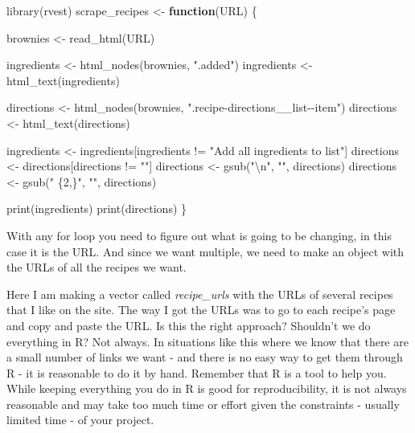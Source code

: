 \documentclass[
]{krantz}
\makeatletter
\newenvironment{Shaded}{\begin{snugshade}}{\end{snugshade}}
\newcommand{\ControlFlowTok}[1]{\textcolor[rgb]{0.27,0.27,0.27}{\textbf{#1}}}
\newcommand{\FunctionTok}[1]{\textcolor[rgb]{0,0,0}{#1}}
\newcommand{\NormalTok}[1]{#1}
\newcommand{\OtherTok}[1]{\textcolor[rgb]{0.37,0.37,0.37}{#1}}
\newcommand{\SpecialCharTok}[1]{\textcolor[rgb]{0,0,0}{#1}}
\newcommand{\StringTok}[1]{\textcolor[rgb]{0.5,0.5,0.5}{#1}}
\newenvironment{kframe}{%
\medskip{}
\setlength{\fboxsep}{.8em}
 \def\at@end@of@kframe{}%
 \ifinner\ifhmode%
  \def\at@end@of@kframe{\end{minipage}}%
  \begin{minipage}{\columnwidth}%
 \fi\fi%
 \def\FrameCommand##1{\hskip\@totalleftmargin \hskip-\fboxsep
 \colorbox{shadecolor}{##1}\hskip-\fboxsep
     \hskip-\linewidth \hskip-\@totalleftmargin \hskip\columnwidth}%
 \MakeFramed {\advance\hsize-\width
   \@totalleftmargin\z@ \linewidth\hsize
   \@setminipage}}%
 {\par\unskip\endMakeFramed%
 \at@end@of@kframe}
\renewenvironment{Shaded}{\begin{kframe}}{\end{kframe}}
\makeatother
\begin{document}
\begin{Shaded}
\begin{Highlighting}[]
\FunctionTok{library}\NormalTok{(rvest)}
\NormalTok{scrape\_recipes }\OtherTok{\textless{}{-}} \ControlFlowTok{function}\NormalTok{(URL) \{}

\NormalTok{  brownies }\OtherTok{\textless{}{-}} \FunctionTok{read\_html}\NormalTok{(URL)}

\NormalTok{  ingredients }\OtherTok{\textless{}{-}} \FunctionTok{html\_nodes}\NormalTok{(brownies, }\StringTok{".added"}\NormalTok{)}
\NormalTok{  ingredients }\OtherTok{\textless{}{-}} \FunctionTok{html\_text}\NormalTok{(ingredients)}

\NormalTok{  directions }\OtherTok{\textless{}{-}} \FunctionTok{html\_nodes}\NormalTok{(brownies, }\StringTok{".recipe{-}directions\_\_list{-}{-}item"}\NormalTok{)}
\NormalTok{  directions }\OtherTok{\textless{}{-}} \FunctionTok{html\_text}\NormalTok{(directions)}

\NormalTok{  ingredients }\OtherTok{\textless{}{-}}\NormalTok{ ingredients[ingredients }\SpecialCharTok{!=} \StringTok{"Add all ingredients to list"}\NormalTok{]}
\NormalTok{  directions }\OtherTok{\textless{}{-}}\NormalTok{ directions[directions }\SpecialCharTok{!=} \StringTok{""}\NormalTok{]}
\NormalTok{  directions }\OtherTok{\textless{}{-}} \FunctionTok{gsub}\NormalTok{(}\StringTok{"}\SpecialCharTok{\textbackslash{}n}\StringTok{"}\NormalTok{, }\StringTok{""}\NormalTok{, directions)}
\NormalTok{  directions }\OtherTok{\textless{}{-}} \FunctionTok{gsub}\NormalTok{(}\StringTok{" \{2,\}"}\NormalTok{, }\StringTok{""}\NormalTok{, directions)}

  \FunctionTok{print}\NormalTok{(ingredients)}
  \FunctionTok{print}\NormalTok{(directions)}
\NormalTok{\}}
\end{Highlighting}
\end{Shaded}

With any for loop you need to figure out what is going to be changing, in this case it is the URL. And since we want multiple, we need to make an object with the URLs of all the recipes we want.

Here I am making a vector called \emph{recipe\_urls} with the URLs of several recipes that I like on the site. The way I got the URLs was to go to each recipe's page and copy and paste the URL. Is this the right approach? Shouldn't we do everything in R? Not always. In situations like this where we know that there are a small number of links we want - and there is no easy way to get them through R - it is reasonable to do it by hand. Remember that R is a tool to help you. While keeping everything you do in R is good for reproducibility, it is not always reasonable and may take too much time or effort given the constraints - usually limited time - of your project.
\end{document}
